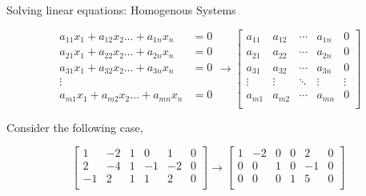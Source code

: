 \documentclass[aspectratio=169]{beamer}
\begin{document}
\begin{frame}[t]{Solving linear equations: Homogenous Systems}
\vspace{-0.75cm}
\begin{footnotesize}
\[
\begin{split}
a_{11}x_1 + a_{12}x_2 \ldots + a_{1n}x_n & = 0\\
a_{21}x_1 + a_{22}x_2 \ldots + a_{2n}x_n & = 0\\
a_{31}x_1 + a_{32}x_2 \ldots + a_{3n}x_n & = 0\\
\vdots &  \\
a_{m1}x_1 + a_{m2}x_2 \ldots + a_{mn}x_n & = 0\\
\end{split} \longrightarrow
\left[
\begin{array}{cccc|c}
a_{11} & a_{12} & \cdots & a_{1n} & 0 \\
a_{21} & a_{22} & \cdots & a_{2n} & 0 \\
a_{31} & a_{32} & \cdots & a_{3n} & 0 \\
\vdots & \vdots & \ddots & \vdots & \vdots \\
a_{m1} & a_{m2} & \cdots & a_{mn} & 0 \\
\end{array}
\right]
\]
\end{footnotesize}
\vspace{-0.1cm} 

\begin{scriptsize}
Consider the following case,
\vspace{-0.2cm} 

\[
\left[
\begin{array}{rrrrr|r}
1 & -2 & 1 & 0 & 1 & 0 \\
2 & -4 & 1 & -1 & -2 & 0 \\
-1 & 2 & 1 & 1 & 2 & 0 \\
\end{array}
\right] \longrightarrow  
\left[
\begin{array}{rrrrr|r}
1 & -2 &  0 &  0 &  2 &  0 \\
0 &  0 &  1 &  0 & -1 &  0 \\
0 &  0 &  0 &  1 &  5 &  0 \\
\end{array}
\right]
\]
\vspace{-0.75cm}


\end{scriptsize}
\end{frame}
\end{document}
